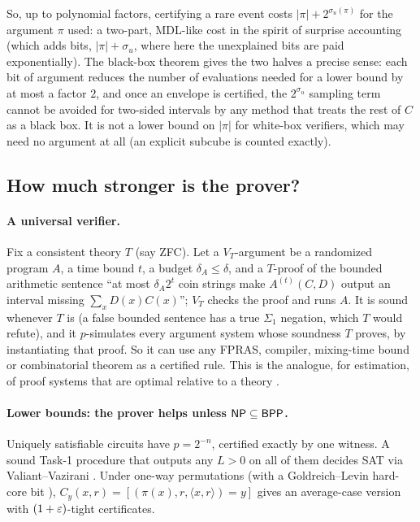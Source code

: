 So, up to polynomial factors, certifying a rare event costs $|\pi|+2^{\sigma_u(\pi)}$
for the argument $\pi$ used: a two-part, MDL-like cost in the spirit of surprise
accounting \cite{hilton2024surprise} (which adds bits, $|\pi|+\sigma_u$, where
here the unexplained bits are paid exponentially). The black-box theorem gives
the two halves a precise sense: each bit of argument reduces the number of
evaluations needed for a lower bound by at most a factor $2$, and once an
envelope is certified, the $2^{\sigma_u}$ sampling term cannot be avoided for
two-sided intervals by any method that treats the rest of $C$ as a black box.
It is not a lower bound on $|\pi|$ for white-box verifiers, which may need no
argument at all (an explicit subcube is counted exactly).

\subsection{How much stronger is the prover?}\label{sec:separations}

\paragraph{A universal verifier.} Fix a consistent theory $T$ (say ZFC). Let a
$V_T$-argument be a randomized program $A$, a time bound $t$, a budget
$\delta_A\le\delta$, and a $T$-proof of the bounded arithmetic sentence
``at most $\delta_A2^t$ coin strings make $A^{(t)}(C,D)$ output an interval
missing $\sum_xD(x)C(x)$''; $V_T$ checks the proof and runs $A$. It is sound
whenever $T$ is (a false bounded sentence has a true $\Sigma_1$ negation,
which $T$ would refute), and it $p$-simulates every argument system whose
soundness $T$ proves, by instantiating that proof. So it can use any FPRAS,
compiler, mixing-time bound or combinatorial theorem as a certified rule. This
is the analogue, for estimation, of proof systems that are optimal relative to
a theory \cite{kp1989}.

\paragraph{Lower bounds: the prover helps unless $\mathsf{NP}\subseteq\mathsf{BPP}$.}
Uniquely satisfiable circuits have $p=2^{-n}$, certified exactly by one
witness. A sound Task-1 procedure that outputs any $L>0$ on all of them
decides SAT via Valiant--Vazirani \cite{vv1986}. Under one-way permutations
(with a Goldreich--Levin hard-core bit \cite{gl1989}),
$C_y(x,r)=[(\pi(x),r,\langle x,r\rangle)=y]$ gives an average-case version
with $(1+\varepsilon)$-tight certificates.

